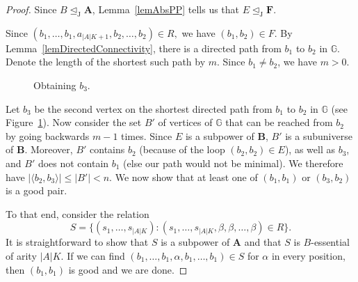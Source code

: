 \documentclass{amsart}
\theoremstyle{plain}
\theoremstyle{definition}
\begin{document}
\begin{proof}
Since $B\operatorname{\trianglelefteq_J} {{\mathbf{A}}}$, Lemma~\ref{lemAbsPP} tells us that $E\operatorname{\trianglelefteq_J} {\mathbf{{F}}}$.

Since $(b_1,\dots,b_1,a_{|A|K+1},b_2,\dots,b_2)\in R,$ we have $(b_1,b_2)\in F$. 
By Lemma~\ref{lemDirectedConnectivity}, there is a directed path from $b_1$ to $b_2$ in
${\mathbb{{G}}}$. Denote the length of the shortest such path
by $m$. Since $b_1\neq b_2$, we have $m>0$. 

\begin{figure}
  \begin{center}
  \end{center}
  \caption{Obtaining $b_3$.}
  \label{figPath}
\end{figure}

Let $b_3$
be the second vertex on the shortest directed path from $b_1$ to $b_2$ in ${\mathbb{{G}}}$
(see Figure~\ref{figPath}). Now consider the set $B'$
of vertices of ${\mathbb{{G}}}$ that can
be reached from $b_2$ by going backwards $m-1$ times. Since $E$ is a subpower of ${\mathbf{{B}}}$, $B'$ is a subuniverse of ${\mathbf{{B}}}$. Moreover, $B'$ contains $b_2$ 
(because of the loop $(b_2,b_2)\in E$), as 
well as $b_3$, and $B'$ does not contain $b_1$ (else our path would not be
minimal). We therefore have $|\langle b_2,b_3\rangle|\leq |B'|<n$. We now show
that at least one of $(b_1,b_1)$ or $(b_3,b_2)$ is a good pair.

To that end, consider the relation 
\[
  S=\{(s_1,\dots,s_{|A|K}) \colon (s_1,\dots,s_{|A|K},\beta,\beta,\dots,\beta)\in
  R\}.
\]
It is straightforward to show that $S$ is a subpower of ${{\mathbf{A}}}$ and that $S$ is $B$-essential of arity $|A|K$.
If we can find 
$(b_1,\dots,b_1,\alpha,b_1,\dots,b_1)\in S$
for $\alpha$ in every position, 
then $(b_1,b_1)$ is good and we are done. 


\end{proof}
\end{document}

